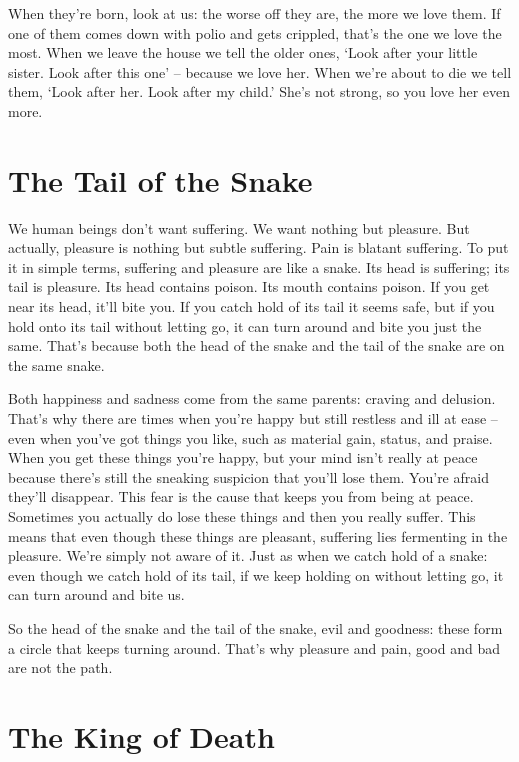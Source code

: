 When they're born, look at us: the worse off they are, the more we love them. If one of them comes down with polio and gets crippled, that's the one we love the most. When we leave the house we tell the older ones, `Look after your little sister. Look after this one' -- because we love her. When we're about to die we tell them, `Look after her. Look after my child.' She's not strong, so you love her even more.

\clearpage

\section{The Tail of the Snake}

\enlargethispage{\baselineskip}
We human beings don't want suffering. We want nothing but pleasure. But actually, pleasure is nothing but subtle suffering. Pain is blatant suffering. To put it in simple terms, suffering and pleasure are like a snake. Its head is suffering; its tail is pleasure. Its head contains poison. Its mouth contains poison. If you get near its head, it'll bite you. If you catch hold of its tail it seems safe, but if you hold onto its tail without letting go, it can turn around and bite you just the same. That's because both the head of the snake and the tail of the snake are on the same snake.

Both happiness and sadness come from the same parents: craving and delusion. That's why there are times when you're happy but still restless and ill at ease -- even when you've got things you like, such as material gain, status, and praise. When you get these things you're happy, but your mind isn't really at peace because there's still the sneaking suspicion that you'll lose them. You're afraid they'll disappear. This fear is the cause that keeps you from being at peace. Sometimes you actually do lose these things and then you really suffer. This means that even though these things are pleasant, suffering lies fermenting in the pleasure. We're simply not aware of it. Just as when we catch hold of a snake: even though we catch hold of its tail, if we keep holding on without letting go, it can turn around and bite us.

So the head of the snake and the tail of the snake, evil and goodness: these form a circle that keeps turning around. That's why pleasure and pain, good and bad are not the path.

\clearpage

\section{The King of Death}

